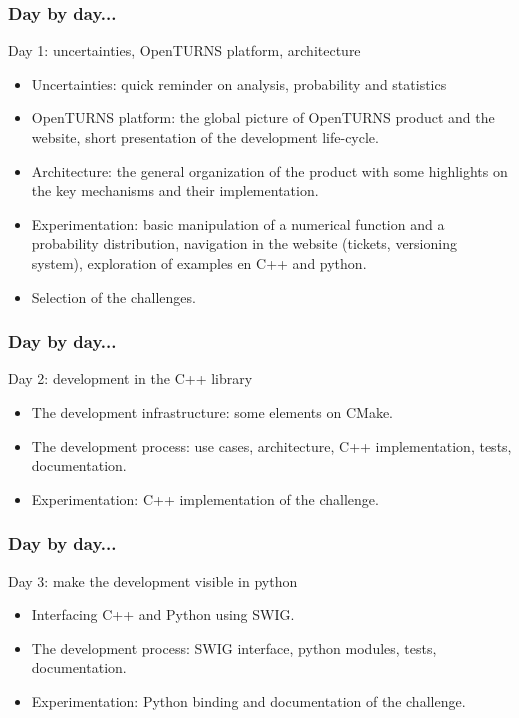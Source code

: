 \documentclass{beamer}
\begin{document}
\begin{frame}
  \frametitle{Day by day...}
  \begin{block}{Day 1: uncertainties, OpenTURNS platform, architecture}
    \begin{itemize}
    \item Uncertainties: quick reminder on analysis, probability and statistics
    \item OpenTURNS platform: the global picture of OpenTURNS product and the website, short presentation of the development life-cycle.
    \item Architecture: the general organization of the product with some highlights on the key mechanisms and their implementation.
    \item Experimentation: basic manipulation of a numerical function and a probability distribution, navigation in the website (tickets, versioning system), exploration of examples en C++ and python.
    \item Selection of the challenges.
    \end{itemize}
  \end{block}
\end{frame}
\begin{frame}
  \frametitle{Day by day...}
  \begin{block}{Day 2: development in the C++ library}
    \begin{itemize}
    \item The development infrastructure: some elements on CMake.
    \item The development process: use cases, architecture, C++ implementation, tests, documentation.
    \item Experimentation: C++ implementation of the challenge.
    \end{itemize}
  \end{block}
\end{frame}
\begin{frame}
  \frametitle{Day by day...}
  \begin{block}{Day 3: make the development visible in python}
    \begin{itemize}
    \item Interfacing C++ and Python using SWIG.
    \item The development process: SWIG interface, python modules, tests, documentation.
    \item Experimentation: Python binding and documentation of the challenge.
    \end{itemize}
  \end{block}
\end{frame}
\end{document}
